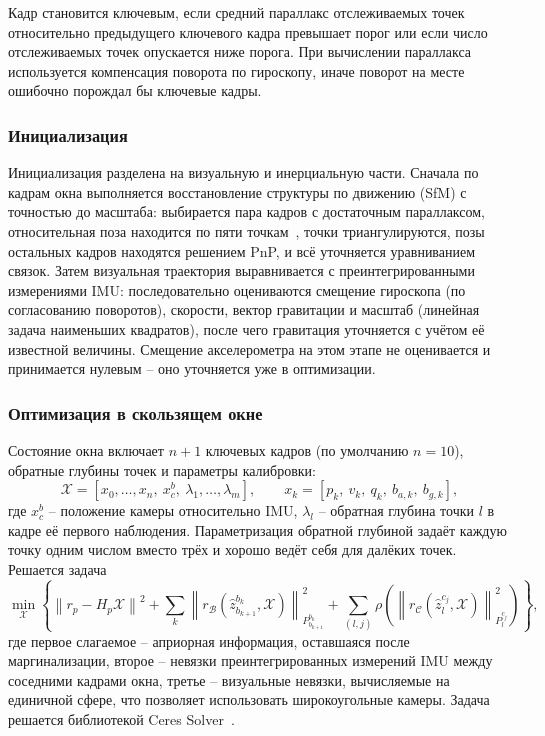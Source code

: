     Кадр становится ключевым, если средний параллакс отслеживаемых точек относительно предыдущего ключевого кадра превышает порог или если число отслеживаемых точек опускается ниже порога.
    При вычислении параллакса используется компенсация поворота по гироскопу, иначе поворот на месте ошибочно порождал бы ключевые кадры.

    \subsubsection{Инициализация}
    Инициализация разделена на визуальную и инерциальную части.
    Сначала по кадрам окна выполняется восстановление структуры по движению (SfM) с точностью до масштаба: выбирается пара кадров с достаточным параллаксом, относительная поза находится по пяти точкам~\cite{five_point}, точки триангулируются, позы остальных кадров находятся решением PnP, и всё уточняется уравниванием связок.
    Затем визуальная траектория выравнивается с преинтегрированными измерениями IMU: последовательно оцениваются смещение гироскопа (по согласованию поворотов), скорости, вектор гравитации и масштаб (линейная задача наименьших квадратов), после чего гравитация уточняется с учётом её известной величины.
    Смещение акселерометра на этом этапе не оценивается и принимается нулевым -- оно уточняется уже в оптимизации.

    \subsubsection{Оптимизация в скользящем окне}
    Состояние окна включает $n+1$ ключевых кадров (по умолчанию $n = 10$), обратные глубины точек и параметры калибровки:
    \begin{equation}\label{eq:vins_state}
        \mathcal{X} = \left[ x_0, \dots, x_n,\ x_c^b,\ \lambda_1, \dots, \lambda_m \right], \qquad
        x_k = \left[ p_k,\ v_k,\ q_k,\ b_{a,k},\ b_{g,k} \right],
    \end{equation}
    где $x_c^b$ -- положение камеры относительно IMU, $\lambda_l$ -- обратная глубина точки $l$ в кадре её первого наблюдения.
    Параметризация обратной глубиной задаёт каждую точку одним числом вместо трёх и хорошо ведёт себя для далёких точек.
    Решается задача
    \begin{equation}\label{eq:vins_cost}
        \min_{\mathcal{X}} \left\{ \left\| r_p - H_p \mathcal{X} \right\|^2 + \sum_{k} \left\| r_{\mathcal{B}}\!\left( \hat{z}_{b_{k+1}}^{b_k}, \mathcal{X} \right) \right\|^2_{P_{b_{k+1}}^{b_k}} + \sum_{(l,j)} \rho\left( \left\| r_{\mathcal{C}}\!\left( \hat{z}_l^{c_j}, \mathcal{X} \right) \right\|^2_{P_l^{c_j}} \right) \right\},
    \end{equation}
    где первое слагаемое -- априорная информация, оставшаяся после маргинализации, второе -- невязки преинтегрированных измерений IMU между соседними кадрами окна, третье -- визуальные невязки, вычисляемые на единичной сфере, что позволяет использовать широкоугольные камеры.
    Задача решается библиотекой Ceres Solver~\cite{ceres}.

